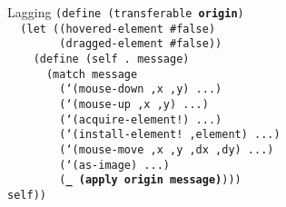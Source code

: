 \begin{frame}{Lagging}
  \texttt{(define (transferable \textbf{origin})\\
    \ \ (let ((hovered-element \#false)\\
    \ \ \ \ \ \ \ \ (dragged-element \#false))\\
    \ \ \ \ (define (self .\ message)\\
    \ \ \ \ \ \ (match message\\
    \ \ \ \ \ \ \ \ (`(mouse-down ,x ,y) ...)\\
    \ \ \ \ \ \ \ \ (`(mouse-up ,x ,y) ...)\\
    \ \ \ \ \ \ \ \ (`(acquire-element!) ...)\\
    \ \ \ \ \ \ \ \ (`(install-element!\ ,element) ...)\\
    \ \ \ \ \ \ \ \ (`(mouse-move ,x ,y ,dx ,dy) ...)\\
    \ \ \ \ \ \ \ \ (`(as-image) ...)\\
    \ \ \ \ \ \ \ \ (\textbf{\_ (apply origin message)})))\\
    self))
  }
\end{frame}


